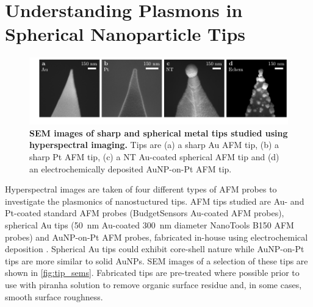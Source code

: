 \documentclass{article}
\begin{document}
\section{Understanding Plasmons in Spherical Nanoparticle Tips}

\begin{figure}[bt]
\centering
\includegraphics{figures/tip_sems}
\caption[SEM images of sharp and spherical metal tips studied using hyperspectral imaging]{\textbf{SEM images of sharp and spherical metal tips studied using hyperspectral imaging.} Tips are  (a) a sharp Au AFM tip, (b) a sharp Pt AFM tip, (c) a NT Au-coated spherical AFM tip and (d) an electrochemically deposited AuNP-on-Pt AFM tip.}
\label{fig:tip_sems}
\vspace{-10pt}
\end{figure}

Hyperspectral images are taken of four different types of AFM probes to investigate the plasmonics of nanostuctured tips. AFM tips studied are Au- and Pt-coated standard AFM probes (BudgetSensors Au-coated AFM probes), spherical Au tips (\SI{50}{nm} Au-coated \SI{300}{nm} diameter NanoTools B150 AFM probes) \cite{savage2012} and AuNP-on-Pt AFM probes, fabricated in-house using electrochemical deposition \cite{sanders2014}. Spherical Au tips could exhibit core-shell nature while AuNP-on-Pt tips are more similar to solid AuNPs. SEM images of a selection of these tips are shown in \autoref{fig:tip_sems}. Fabricated tips are pre-treated where possible prior to use with piranha solution to remove organic surface residue and, in some cases, smooth surface roughness. %
\end{document}
